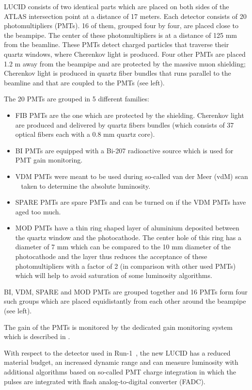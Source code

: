 LUCID consists of two identical parts which are placed on both sides of the ATLAS intersection point at a distance of 17 meters.
Each detector consists of 20 photomultipliers (PMTs).
16 of them, grouped four by four, are placed close to the beampipe. The center of these photomultipliers is at a distance of 125 mm from the beamline.
These PMTs detect charged particles that traverse their quartz windows, where Cherenkov light is produced.
Four other PMTs are placed 1.2 m away from the beampipe and are protected by the massive muon shielding; 
Cherenkov light is produced in quartz fiber bundles that runs parallel to the beamline and that are coupled to the PMTs (see  left).

The 20 PMTs are grouped in 5 different families:
\begin{itemize}
 \item FIB PMTs are the one which are protected by the shielding. Cherenkov light are produced and delivered by quartz fibers bundles 
 (which consists of 37 optical fibers each with a 0.8 mm quartz core).
 \item BI PMTs are equipped with a Bi-207 radioactive source which is used for PMT gain monitoring. 
 \item VDM PMTs were meant to be used during so-called van der Meer (vdM) scan ~\cite{vanderMeer:296752,Rubbia:1025746} taken to determine the absolute luminosity.
 \item SPARE PMTs are spare PMTs and can be turned on if the VDM PMTs have aged too much.
 \item MOD PMTs have a thin ring shaped layer of aluminium deposited between the quartz window and the photocathode. 
 The center hole of this ring has a diameter of 7 mm which can be compared to the 10 mm diameter of the photocathode 
 and the layer thus reduces the acceptance of these photomultipliers with a factor of 2 (in comparison with other used PMTs) 
 which will help to avoid saturation of some luminosity algorithms.
\end{itemize}

BI, VDM, SPARE and MOD PMTs are grouped together and 16 PMTs form four such groups which are placed equidistantly from each other around the beampipe (see  left).

The gain of the PMTs is monitored by the dedicated gain monitoring system which is described in .

With respect to the detector used in Run-1~\cite{Aad:2013ucp}, the new LUCID has a reduced material budget, 
an increased dynamic range and can measure luminosity with additional algorithms based on so-called PMT charge integration in which the pulses are integrated with 
flash analog-to-digital converter (FADC).


